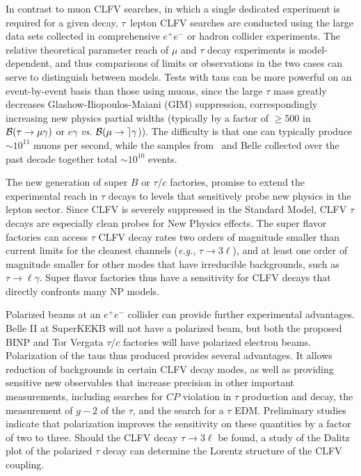 In contrast to muon CLFV searches, in which a single dedicated experiment is required for a given decay,  $\tau$~lepton CLFV searches are conducted using the large data sets collected in comprehensive $e^+e^-$ or hadron collider experiments. The relative theoretical parameter reach of $\mu$ and $\tau$ decay experiments is model-dependent, and thus comparisons of limits or observations in the two cases can serve to distinguish between models.
Tests with taus can be more powerful on an event-by-event basis than those using muons, since the large $\tau$ mass greatly decreases 
Glashow-Iliopoulos-Maiani (GIM) suppression, correspondingly increasing new physics partial widths (typically by a factor of $\geq 500$ in $\cal{B}(\tau \rightarrow \mu \gamma)$ or $e \gamma$ {\it vs.} $\cal{B}(\mu \rightarrow e \gamma$)).  The difficulty is that one can typically produce $\sim 10^{11}$ muons per second, while the samples from \babar\ and Belle collected over the past decade together total $\sim 10^{10}$ events.  

The new generation of super $B$ or $\tau$/$c$ factories, \cite{ref:superkekb} promise to extend the
experimental reach in $\tau$ decays to levels that sensitively
probe new physics in the lepton sector. Since CLFV is severely suppressed in the Standard Model, CLFV $\tau$ decays
are especially clean probes for New Physics
effects.  The
super flavor factories can access $\tau$ CLFV decay rates two orders of magnitude smaller than current limits for the cleanest channels
({\it e.g.}, $\tau\to 3\ell$), and at least one order of magnitude smaller for other
modes that have irreducible backgrounds, such as $\tau\to \ell\gamma$. Super flavor factories thus have a sensitivity for CLFV decays that directly confronts many NP models. 

Polarized beams at an $e^+e^-$ collider can provide further
experimental advantages.   Belle II at \hbox{SuperKEKB} will not have a polarized beam, but both the proposed BINP and Tor Vergata $\tau$/$c$ factories will have polarized electron beams.  Polarization of the taus thus produced provides several advantages. It allows reduction of backgrounds in certain
CLFV decay modes, as well as providing sensitive new
observables that increase precision in other important measurements, including
searches for $C\!P$ violation in $\tau$ production and decay, the measurement
of $g-2$ of the $\tau$, and the search for a $\tau$ EDM.  Preliminary studies indicate that polarization improves the sensitivity on these quantities by a factor of two to three. Should the CLFV decay $\tau \rightarrow 3\ell$ be found, a study of the Dalitz plot of the polarized $\tau$ decay can determine the Lorentz structure of the CLFV coupling.


